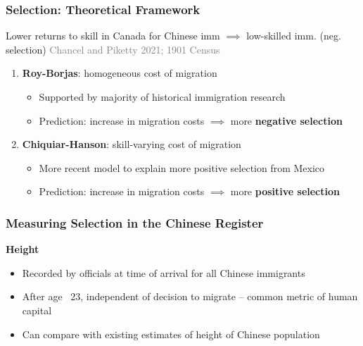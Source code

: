\documentclass[xcolor=dvipsnames, compress, 12pt, aspectratio=169, handout]{beamer}
\begin{document}
\begin{frame}
    \label{theory_main}
    \frametitle{Selection: Theoretical Framework \hyperlink{theory1}{}}
    Lower returns to skill in Canada for Chinese imm $\implies$ low-skilled imm. (neg. selection) \textcolor{gray}{Chancel and Piketty 2021; 1901 Census} \vspace{2mm}
    \begin{enumerate}
        \item \textbf{Roy-Borjas}: homogeneous cost of migration \vspace{2mm}
        \begin{itemize}
            \item Supported by majority of historical immigration research \vspace{1mm}
            \item Prediction: increase in migration costs $\implies$ more \textbf{negative selection} \vspace{2mm}
        \end{itemize}
        \item \textbf{Chiquiar-Hanson}: skill-varying cost of migration  \vspace{2mm}
        \begin{itemize}
            \item More recent model to explain more positive selection from Mexico \vspace{1mm}
            \item Prediction: increase in migration costs $\implies$ more \textbf{positive selection}
        \end{itemize}
    \end{enumerate}
\end{frame}

\begin{frame}
    \frametitle{Measuring Selection in the Chinese Register}
    \textbf{Height} \vspace{2mm}
    \begin{itemize}
        \item Recorded by officials at time of arrival for all Chinese immigrants \vspace{2mm}
        \item After age ~23, independent of decision to migrate -- common metric of human capital  \vspace{2mm}
        \item Can compare with existing estimates of height of Chinese population \vspace{2mm}
    \end{itemize}
\end{frame}
\end{document}
